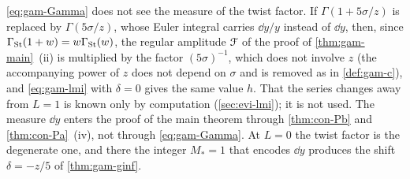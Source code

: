 \begin{rmk}
\label{rmk:gam-blind}
\eqref{eq:gam-Gamma} does not see the measure of the twist factor. If $\Gamma(1+5\sigma/z)$ is replaced by $\Gamma(5\sigma/z)$, whose Euler integral carries $\dd y/y$ instead of $\dd y$, then, since $\Gamma_{\mathrm{St}}(1+w)=w\Gamma_{\mathrm{St}}(w)$, the regular amplitude $\mathcal{F}$ of the proof of \cref{thm:gam-main}~(ii) is multiplied by the factor $(5\sigma)^{-1}$, which does not involve $z$ (the accompanying power of $z$ does not depend on $\sigma$ and is removed as in \cref{def:gam-c}), and \eqref{eq:gam-lmi} with $\delta=0$ gives the same value $h$. That the series changes away from $L=1$ is known only by computation (\cref{sec:evi-lmi}); it is not used. The measure $\dd y$ enters the proof of the main theorem through \cref{thm:con-Pb} and \cref{thm:con-Pa}~(iv), not through \eqref{eq:gam-Gamma}. At $L=0$ the twist factor is the degenerate one, and there the integer $M_*=1$ that encodes $\dd y$ produces the shift $\delta=-z/5$ of \cref{thm:gam-ginf}.
\end{rmk}

